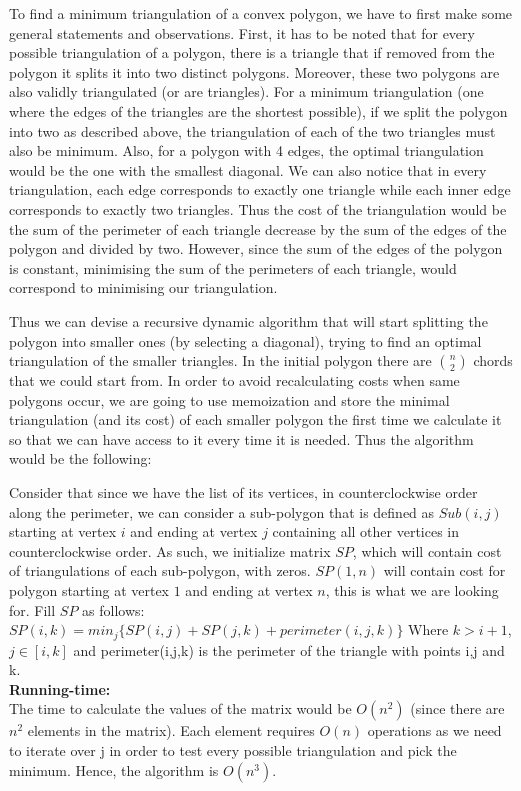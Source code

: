 To find a minimum triangulation of a convex polygon, we have to first make some general statements and observations. First, it has to be noted that for every possible triangulation of a polygon, there is a triangle that if removed from the polygon it splits it into two distinct polygons. Moreover, these two polygons are also validly triangulated (or are triangles). For a minimum triangulation (one where the edges of the triangles are the shortest possible), if we split the polygon into two as described above, the triangulation of each of the two triangles must also be minimum. Also, for a polygon with 4 edges, the optimal triangulation would be the one with the smallest diagonal. We can also notice that in every triangulation, each edge corresponds to exactly one triangle while each inner edge corresponds to exactly two triangles. Thus the cost of the triangulation would be the sum of the perimeter of each triangle decrease by the sum of the edges of the polygon and divided by two. However, since the sum of the edges of the polygon is constant, minimising the sum of the perimeters of each triangle, would correspond to minimising our triangulation. 

Thus we can devise a recursive dynamic algorithm that will start splitting the polygon into smaller ones (by selecting a diagonal), trying to find an optimal triangulation of the smaller triangles. In the initial polygon there are $\binom n 2$ chords that we could start from. In order to avoid recalculating costs when same polygons occur, we are going to use memoization and store the minimal triangulation (and its cost) of each smaller polygon the first time we calculate it so that we can have access to it every time it is needed. Thus the algorithm would be the following:

Consider that since we have the list of its vertices, in counterclockwise order along the perimeter, we can consider a sub-polygon that is defined as $Sub(i,j)$ starting at vertex $i$ and ending at vertex $j$ containing all other vertices in counterclockwise order. As such, we initialize matrix $SP$, which will contain cost of triangulations of each sub-polygon, with zeros. $SP(1,n)$ will contain cost for polygon starting at vertex $1$ and ending at vertex $n$, this is what we are looking for. Fill $SP$ as follows: $SP(i,k) = min_j \{SP(i,j) + SP(j,k) + perimeter(i,j,k)\}$ Where $k > i+1$, $j \in [i,k]$ and perimeter(i,j,k) is the perimeter of the triangle with points i,j and k.\\

\textbf{Running-time:}\\
The time to calculate the values of the matrix would be $O(n^2)$ (since there are $n^2$ elements in the matrix). Each element requires $O(n)$ operations as we need to iterate over j in order to test every possible triangulation and pick the minimum. Hence, the algorithm is $O(n^3)$.